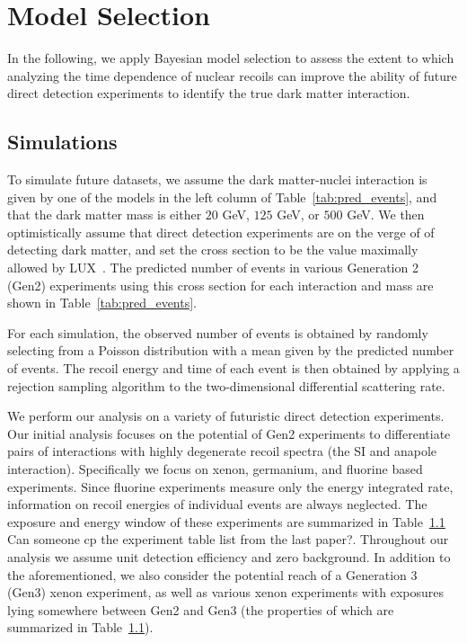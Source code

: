 \documentclass[11pt]{article}
\newcommand{\sjwColor}{red}
\newcommand{\sjw}[1]{{\color{\sjwColor} #1}}
\begin{document}
\section{Model Selection} \label{sec:procedure}

In the following, we apply Bayesian model selection to assess the extent to which analyzing the time dependence of nuclear recoils can improve the ability of future direct detection experiments to identify the true dark matter interaction. 
   

\subsection{Simulations \label{sec:sims}}

To simulate future datasets, we assume the dark matter-nuclei interaction is given by one of the models in the left column of Table~\ref{tab:pred_events}, and that the dark matter mass is either $20$ GeV, $125$ GeV, or $500$ GeV. We then optimistically assume that direct detection experiments are on the verge of of detecting dark matter, and set the cross section to be the value maximally allowed by LUX~\cite{Akerib:2016vxi}. The predicted number of events in various Generation 2 (Gen2) experiments using this cross section for each interaction and mass are shown in Table~\ref{tab:pred_events}. 

For each simulation, the observed number of events is obtained by randomly selecting from a Poisson distribution with a mean given by the predicted number of events. The recoil energy and time of each event is then obtained by applying a rejection sampling algorithm to the two-dimensional differential scattering rate. 

We perform our analysis on a variety of futuristic direct detection experiments. Our initial analysis focuses on the potential of Gen2 experiments to differentiate pairs of interactions with highly degenerate recoil spectra (\eg the SI and anapole interaction). Specifically we focus on xenon, germanium, and fluorine based experiments. Since fluorine experiments measure only the energy integrated rate, information on recoil energies of individual events are always neglected.  The exposure and energy window of these experiments are summarized in Table~\ref{} \sjw{Can someone cp the experiment table list from the last paper?}. Throughout our analysis we assume unit detection efficiency and zero background. In addition to the aforementioned, we also consider the potential reach of a Generation 3 (Gen3) xenon experiment, as well as various xenon experiments with exposures lying somewhere between Gen2 and Gen3 (the properties of which are summarized in Table~\ref{}).    
\end{document}
